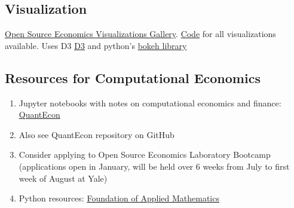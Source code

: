 \documentclass{article}
\begin{document}
\subsection{Visualization}
\href{http://www.oselab.org/gallery}{Open Source Economics Visualizations Gallery}. \href{https://github.com/OpenSourceEcon/OGvisualizations}{Code} for all visualizations available. Uses D3 \href{https://d3js.org/}{D3} and python’s \href{https://bokeh.pydata.org/en/latest/index.html}{bokeh library}

\subsection{Resources for Computational Economics}
\begin{enumerate}
	\item Jupyter notebooks with notes on computational economics and finance: \href{https://notes.quantecon.org/}{QuantEcon}
	\item  Also see QuantEcon repository on GitHub
	\item Consider applying to Open Source Economics Laboratory Bootcamp (applications open in January, will be held over 6 weeks from July to first week of August at Yale)
	\item Python resources: \href{https://foundations-of-applied-mathematics.github.io/}{Foundation of Applied Mathematics} 
\end{enumerate}
\end{document}
